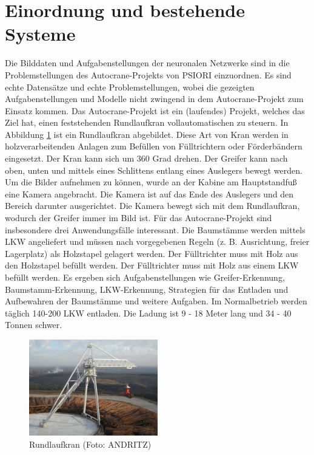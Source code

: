 	\section{Einordnung und bestehende Systeme}
	\label{sec:BestehendesSystem}
	Die Bilddaten und Aufgabenstellungen der neuronalen Netzwerke sind in die Problemstellungen des Autocrane-Projekts \cite{PSIORIGmbH.2020} von PSIORI einzuordnen. Es sind echte Datensätze und echte Problemstellungen, wobei die gezeigten Aufgabenstellungen und Modelle nicht zwingend in dem Autocrane-Projekt zum Einsatz kommen. Das Autocrane-Projekt ist ein (laufendes) Projekt, welches das Ziel hat, einen feststehenden Rundlaufkran vollautomatischen zu steuern. In Abbildung \ref{img:CircularCrane} ist ein Rundlaufkran abgebildet. Diese Art von Kran werden in holzverarbeitenden Anlagen zum Befüllen von Fülltrichtern oder Förderbändern eingesetzt. Der Kran kann sich um 360 Grad drehen. Der Greifer kann nach oben, unten und mittels eines Schlittens entlang eines Auslegers bewegt werden. Um die Bilder aufnehmen zu können, wurde an der Kabine am Hauptstandfuß eine Kamera angebracht. Die Kamera ist auf das Ende des Auslegers und den Bereich darunter ausgerichtet. Die Kamera bewegt sich mit dem Rundlaufkran, wodurch der Greifer immer im Bild ist. Für das Autocrane-Projekt sind insbesondere drei Anwendungsfälle interessant. Die Baumstämme werden mittels LKW angeliefert und müssen nach vorgegebenen Regeln (z. B. Ausrichtung, freier Lagerplatz) als Holzstapel gelagert werden. Der Fülltrichter muss mit Holz aus den Holzstapel befüllt werden. Der Fülltrichter muss mit Holz aus einem LKW befüllt werden. Es ergeben sich Aufgabenstellungen wie Greifer-Erkennung, Baumstamm-Erkennung, LKW-Erkennung, Strategien für das Entladen und Aufbewahren der Baumstämme und weitere Aufgaben. Im Normalbetrieb werden täglich 140-200 LKW entladen. Die Ladung ist 9 - 18 Meter lang und 34 - 40 Tonnen schwer. 
	\begin{figure}[h]
		\centering
		\includegraphics[width=0.5\textwidth, center]{bilder/Grundlagen/Kran_vollstaendig_N1_030.jpg}
		\caption[Rundlaufkran]{Rundlaufkran (Foto: ANDRITZ)}
		\label{img:CircularCrane}
	\end{figure}		

